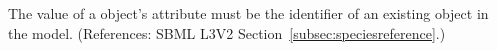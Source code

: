 The value of a \SpeciesReference object's  attribute must be
the identifier of an existing \Species object in the model.  (References:
SBML L3V2 Section~\ref{subsec:speciesreference}.)
